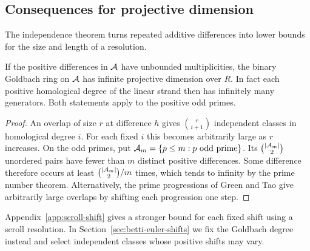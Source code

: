 \subsection{Consequences for projective dimension}
The independence theorem turns repeated additive differences into
lower bounds for the size and length of a resolution.

\begin{corollary}\label{cor:density}
If the positive differences in $\mathcal A$ have unbounded multiplicities,
the binary Goldbach ring on $\mathcal A$ has infinite projective dimension over
$R$. In fact each positive homological degree of the linear
strand then has infinitely many generators. Both statements apply to
the positive odd primes.
\end{corollary}
\begin{proof}
An overlap of size $r$ at difference $h$ gives $\binom{r}{i+1}$
independent classes in homological degree $i$. For each fixed $i$ this
becomes arbitrarily large as $r$ increases. On the odd primes, put
$\mathcal A_m=\{p\le m:p\text{ odd prime}\}$. Its $\binom{|\mathcal A_m|}{2}$
unordered pairs have fewer than $m$ distinct positive differences. Some
difference therefore occurs at least $\binom{|\mathcal A_m|}{2}/m$ times,
which tends to infinity by the prime number theorem. Alternatively,
the prime progressions of Green and Tao \cite{GreenTao08} give
arbitrarily large overlaps by shifting each progression one step.
\end{proof}

Appendix~\ref{app:scroll-shift} gives a stronger bound for each fixed
shift using a scroll resolution. In Section~\ref{sec:betti-euler-shifts}
we fix the Goldbach degree instead and select independent classes
whose positive shifts may vary.

